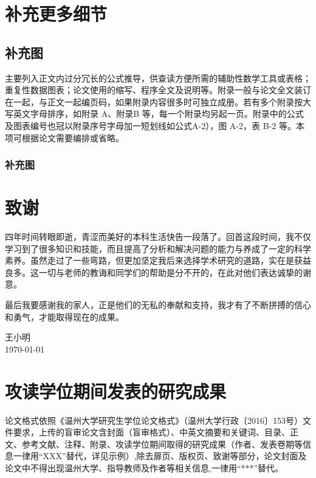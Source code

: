 \documentclass{wzuthesis} %
\begin{document}
{
    \appendix
    \renewcommand{\chaptermark}[1]{\markboth{\heiti  附录\thechapter\ ~#1}{}}
    \chapter{补充更多细节}

    \section{补充图}
    主要列入正文内过分冗长的公式推导，供查读方便所需的辅助性数学工具或表格；重复性数据图表；论文使用的缩写、程序全文及说明等。附录一般与论文全文装订在一起，与正文一起编页码，如果附录内容很多时可独立成册。若有多个附录按大写英文字母排序，如附录 A、附录B 等，每一个附录均另起一页。附录中的公式及图表编号也冠以附录序号字母加一短划线如公式A-2），图 A-2，表 B-2 等。本项可根据论文需要编排或省略。
    \subsection{补充图}

    \newclearpage
}
\ifdefined\blind  %
\else
    \chapter{致谢}

    四年时间转眼即逝，青涩而美好的本科生活快告一段落了。回首这段时间，我不仅学习到了很多知识和技能，而且提高了分析和解决问题的能力与养成了一定的科学素养。虽然走过了一些弯路，但更加坚定我后来选择学术研究的道路，实在是获益良多。这一切与老师的教诲和同学们的帮助是分不开的，在此对他们表达诚挚的谢意。

    最后我要感谢我的家人，正是他们的无私的奉献和支持，我才有了不断拼搏的信心和勇气，才能取得现在的成果。

    \vskip 108pt
    \begin{flushright}
        王小明\makebox[1cm]{} \\
        \today
    \end{flushright}
    \newclearpage
\fi
\chapter{攻读学位期间发表的研究成果}

论文格式依照《温州大学研究生学位论文格式》（温州大学行政〔2016〕153号）文件要求，上传的盲审论文含封面（盲审格式）、中英文摘要和关键词、目录、正文、参考文献、注释、附录、攻读学位期间取得的研究成果（作者、发表卷期等信息一律用“XXX”替代，详见示例）,除去扉页、版权页、致谢等部分，论文封面及论文中不得出现温州大学、指导教师及作者等相关信息,一律用“***”替代。
\end{document}
